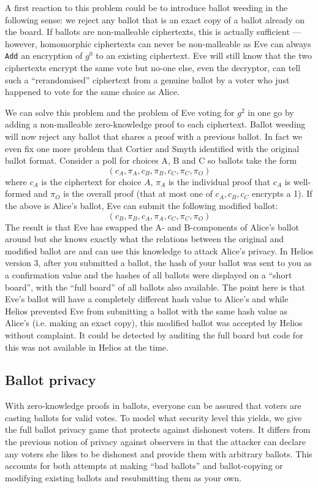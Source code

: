 \documentclass[envcountsame]{llncs}
\newcommand{\alg}[1]{\textup{\texttt{#1}}}
\newenvironment{helios}{\begin{framed}
\vspace{-18pt}
\begin{figure}
\vspace{-12pt}\quad{\Huge \Sun}
\end{figure}}{\end{framed}}
\begin{document}
\begin{helios}
A first reaction to this problem could be to introduce ballot weeding in the
following sense: we reject any ballot that is an exact copy of a ballot already
on the board. If ballots are non-malleable ciphertexts, this is actually
sufficient --- however, homomorphic ciphertexts can never be non-malleable as
Eve can always \alg{Add} an encryption of $g^0$ to an existing ciphertext. Eve
will still know that the two ciphertexts encrypt the same vote but no-one else,
even the decryptor, can tell such a ``rerandomised'' ciphertext from a genuine
ballot by a voter who just happened to vote for the same choice as Alice.

We can solve this problem and the problem of Eve voting for $g^2$ in one go by
adding a non-malleable zero-knowledge proof to each ciphertext. Ballot weeding
will now reject any ballot that shares a proof with a previous ballot. In fact
we even fix one more problem that Cortier and Smyth identified with the original
ballot format. Consider a poll for choices A, B and C so ballots take the form
\[
(c_A, \pi_A, c_B, \pi_B, c_C, \pi_C, \pi_O)
\]
where $c_A$ is the ciphertext for choice $A$, $\pi_A$ is the individual proof
that $c_A$ is well-formed and $\pi_O$ is the overall proof (that at most one
of $c_A, c_B, c_C$ encrypts a 1). If the above is Alice's ballot, Eve can submit
the following modified ballot:
\[
(c_B, \pi_B, c_A, \pi_A, c_C, \pi_C, \pi_O)
\]
The result is that Eve has swapped the A- and B-components of Alice's ballot around but she knows exactly what the relations between the original and
modified ballot are and can use this knowledge to attack Alice's privacy. In
Helios version 3, after you submitted a ballot, the hash of your ballot was
sent to you as a confirmation value and the hashes of all ballots were displayed
on a ``short board'', with the ``full board'' of all ballots also available. The
point here is that Eve's ballot will have a completely different hash value to
Alice's and while Helios prevented Eve from submitting a ballot with the same
hash value as Alice's (i.e. making an exact copy), this modified ballot was
accepted by Helios without complaint. It could be detected by auditing the full
board but code for this was not available in Helios at the time.
\end{helios}

\subsection{Ballot privacy}

With zero-knowledge proofs in ballots, everyone can be assured that voters are
casting ballots for valid votes. To model what security level this yields, we
give the full ballot privacy game that protects against dishonest voters. It
differs from the previous notion of privacy against observers in that the
attacker can declare any voters she likes to be dishonest and provide them with
arbitrary ballots. This accounts for both attempts at making ``bad ballots'' and
ballot-copying or modifying existing ballots and resubmitting them as your own.
\end{document}
